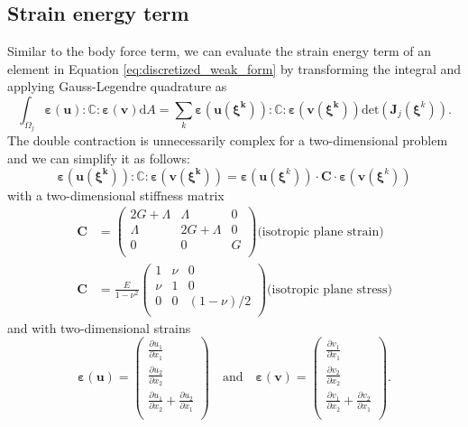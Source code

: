 \subsection{Strain energy term}
Similar to the body force term, we can evaluate the strain energy term of an element in Equation \eqref{eq:discretized_weak_form} by transforming the integral and applying Gauss-Legendre quadrature as 
\begin{equation}
    \int_{\Omega_j} \pmb{\varepsilon}(\mathbf{u}) : \mathbb{C} :  \pmb{\varepsilon}(\mathbf{v}) \text{d}A 
    = \sum_k \pmb{\varepsilon}\left(\mathbf{u}(\pmb{\xi^k})\right) : \mathbb{C} :  \pmb{\varepsilon}\left(\mathbf{v}(\pmb{\xi^k})\right)  \text{det}\left(\mathbf{J}_j(\pmb{\xi}^k)\right).
\end{equation}
The double contraction is unnecessarily complex for a two-dimensional problem and we can simplify it as follows:
\begin{equation}
    \pmb{\varepsilon}\left(\mathbf{u}(\pmb{\xi^k})\right) : \mathbb{C} :  \pmb{\varepsilon}\left(\mathbf{v}(\pmb{\xi^k})\right) = 
    \pmb{\varepsilon}\left(\mathbf{u}(\pmb{\xi}^k)\right)
    \cdot 
    \mathbf{C}
    \cdot 
    \pmb{\varepsilon}\left(\mathbf{v}(\pmb{\xi}^k)\right)
\end{equation}
with a two-dimensional stiffness matrix
\begin{align}
        \mathbf{C} &= \begin{pmatrix}
        2G+\Lambda & \Lambda & 0 \\
        \Lambda & 2G+\Lambda &  0 \\
        0 & 0 & G \\
    \end{pmatrix} \textrm{(isotropic plane strain)}\\
    \mathbf{C} &= \frac{E}{1-\nu^2}\begin{pmatrix}
        1 & \nu & 0 \\
        \nu & 1 &  0 \\
        0 & 0 & (1-\nu)/2 \\
    \end{pmatrix} \textrm{(isotropic plane stress)}
\end{align}
and with two-dimensional strains
\begin{equation}
    \pmb{\varepsilon}(\mathbf{u}) = 
    \begin{pmatrix}
        \frac{\partial u_1}{\partial x_1} \\ 
        \frac{\partial u_2}{\partial x_2} \\
        \frac{\partial u_1}{\partial x_2} + \frac{\partial u_2}{\partial x_1}\\
    \end{pmatrix}
    \quad 
    \textrm{and}
    \quad
    \pmb{\varepsilon}(\mathbf{v}) = 
    \begin{pmatrix}
        \frac{\partial v_1}{\partial x_1} \\ 
        \frac{\partial v_2}{\partial x_2} \\
        \frac{\partial v_1}{\partial x_2} + \frac{\partial v_2}{\partial x_1}\\
    \end{pmatrix}.
\end{equation}
